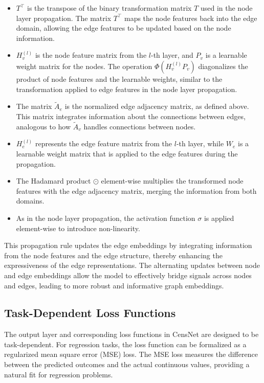 \begin{itemize}
    \item \textbf{ \( T^\top \)} is the transpose of the binary transformation matrix \( T \) used in the node layer propagation. The matrix \( T^\top \) maps the node features back into the edge domain, allowing the edge features to be updated based on the node information.
    \item \( H^{(l)}_v \) is the node feature matrix from the \( l \)-th layer, and \( P_v \) is a learnable weight matrix for the nodes. The operation \( \Phi(H^{(l)}_v P_v) \) diagonalizes the product of node features and the learnable weights, similar to the transformation applied to edge features in the node layer propagation. 
    \item The matrix \( \tilde{A}_e \) is the normalized edge adjacency matrix, as defined above. This matrix integrates information about the connections between edges, analogous to how \( \tilde{A}_v \) handles connections between nodes. 
    \item \( H^{(l)}_e \) represents the edge feature matrix from the \( l \)-th layer, while \( W_e \) is a learnable weight matrix that is applied to the edge features during the propagation.
    \item The Hadamard product \( \odot \) element-wise multiplies the transformed node features with the edge adjacency matrix, merging the information from both domains.
    \item As in the node layer propagation, the activation function \( \sigma \) is applied element-wise to introduce non-linearity.

\end{itemize}

This propagation rule updates the edge embeddings by integrating information from the node features and the edge structure, thereby enhancing the expressiveness of the edge representations. The alternating updates between node and edge embeddings allow the model to effectively bridge signals across nodes and edges, leading to more robust and informative graph embeddings.




\subsection{Task-Dependent Loss Functions}

The output layer and corresponding loss functions in CensNet are designed to be task-dependent. For regression tasks, the loss function can be formalized as a regularized mean square error (MSE) loss. The MSE loss measures the difference between the predicted outcomes and the actual continuous values, providing a natural fit for regression problems.


